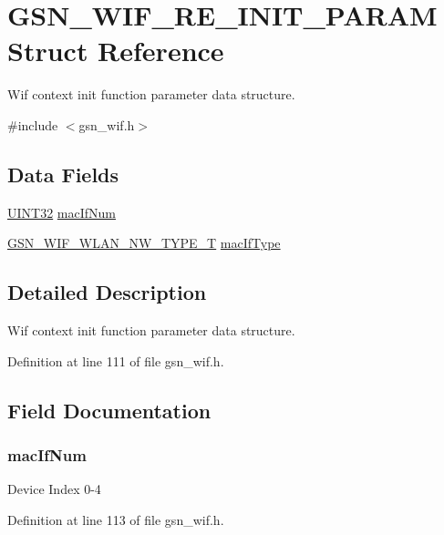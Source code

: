 \hypertarget{a00342}{
\section{GSN\_\-WIF\_\-RE\_\-INIT\_\-PARAM Struct Reference}
\label{a00342}
}


Wif context init function parameter data structure.  




{\ttfamily \#include $<$gsn\_\-wif.h$>$}

\subsection*{Data Fields}
\begin{DoxyCompactItemize}
\item 
\hyperlink{a00660_gae1e6edbbc26d6fbc71a90190d0266018}{UINT32} \hyperlink{a00342_aacea9b36a9084b16b483db4716bf7ea1}{macIfNum}
\item 
\hyperlink{a00677_gabc852e0cb262314c5f307a3e9802921e}{GSN\_\-WIF\_\-WLAN\_\-NW\_\-TYPE\_\-T} \hyperlink{a00342_a3ee37b79013f1da93271b12024198eed}{macIfType}
\end{DoxyCompactItemize}


\subsection{Detailed Description}
Wif context init function parameter data structure. 

Definition at line 111 of file gsn\_\-wif.h.



\subsection{Field Documentation}
\hypertarget{a00342_aacea9b36a9084b16b483db4716bf7ea1}{
\subsubsection[{macIfNum}]{ {\bf macIfNum}}}
\label{a00342_aacea9b36a9084b16b483db4716bf7ea1}
Device Index 0-\/4 

Definition at line 113 of file gsn\_\-wif.h.


